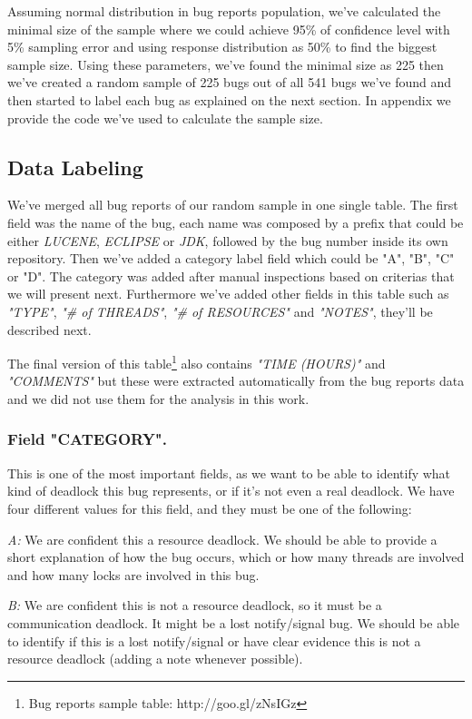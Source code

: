 Assuming normal distribution in bug reports population, we've calculated the minimal size of the sample where we could achieve 95\% of confidence level with 5\% sampling error and using response distribution as 50\% to find the biggest sample size. Using these parameters, we've found the minimal size as 225 then we've created a random sample of 225 bugs out of all 541 bugs we've found and then started to label each bug as explained on the next section. In appendix we provide the code we've used to calculate the sample size.

\subsection{Data Labeling}

We've merged all bug reports of our random sample in one single table. The first field was the name of the bug, each name was composed by a prefix that could be either \emph{LUCENE}, \emph{ECLIPSE} or \emph{JDK}, followed by the bug number inside its own repository. Then we've added a category label field which could be "A", "B", "C" or "D". The category was added after manual inspections based on criterias that we will present next. Furthermore we've added other fields in this table such as \emph{"TYPE"}, \emph{"\# of THREADS"}, \emph{"\# of RESOURCES"} and \emph{"NOTES"}, they'll be described next.

The final version of this table\footnote{Bug reports sample table: http://goo.gl/zNsIGz} also contains \emph{"TIME (HOURS)"} and \emph{"COMMENTS"} but these were extracted automatically from the bug reports data and we did not use them for the analysis in this work.

\subsubsection{Field "CATEGORY".}

This is one of the most important fields, as we want to be able to identify what kind of deadlock this bug represents, or if it's not even a real deadlock. We have four different values for this field, and they must be one of the following:

\emph{A:} We are confident this a resource deadlock. We should be able to provide a short explanation of how the bug occurs, which or how many threads are involved and how many locks are involved in this bug.

\emph{B:} We are confident this is not a resource deadlock, so it must be a communication deadlock. It might be a lost notify/signal bug. We should be able to identify if this is a lost notify/signal or have clear evidence this is not a resource deadlock (adding a note whenever possible).


